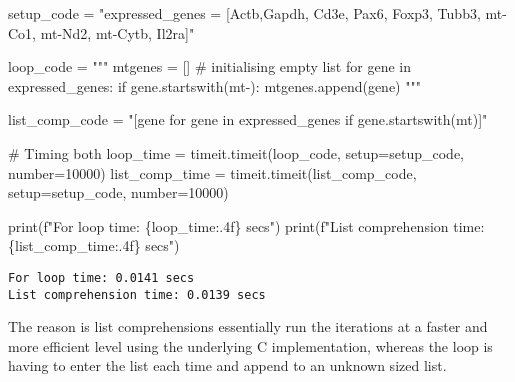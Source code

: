 \documentclass[
  letterpaper,
  DIV=11,
  numbers=noendperiod]{scrartcl}
\newenvironment{Shaded}{\begin{snugshade}}{\end{snugshade}}
\newcommand{\BuiltInTok}[1]{\textcolor[rgb]{0.00,0.23,0.31}{#1}}
\newcommand{\CommentTok}[1]{\textcolor[rgb]{0.37,0.37,0.37}{#1}}
\newcommand{\DecValTok}[1]{\textcolor[rgb]{0.68,0.00,0.00}{#1}}
\newcommand{\NormalTok}[1]{\textcolor[rgb]{0.00,0.23,0.31}{#1}}
\newcommand{\OperatorTok}[1]{\textcolor[rgb]{0.37,0.37,0.37}{#1}}
\newcommand{\SpecialCharTok}[1]{\textcolor[rgb]{0.37,0.37,0.37}{#1}}
\newcommand{\SpecialStringTok}[1]{\textcolor[rgb]{0.13,0.47,0.30}{#1}}
\newcommand{\StringTok}[1]{\textcolor[rgb]{0.13,0.47,0.30}{#1}}
\begin{document}
\begin{Shaded}
\begin{Highlighting}[]
\NormalTok{setup\_code }\OperatorTok{=} \StringTok{"expressed\_genes = [\textquotesingle{}Actb\textquotesingle{},\textquotesingle{}Gapdh\textquotesingle{}, \textquotesingle{}Cd3e\textquotesingle{}, \textquotesingle{}Pax6\textquotesingle{}, \textquotesingle{}Foxp3\textquotesingle{}, \textquotesingle{}Tubb3\textquotesingle{}, \textquotesingle{}mt{-}Co1\textquotesingle{}, \textquotesingle{}mt{-}Nd2\textquotesingle{}, \textquotesingle{}mt{-}Cytb\textquotesingle{}, \textquotesingle{}Il2ra\textquotesingle{}]"}

\NormalTok{loop\_code }\OperatorTok{=} \StringTok{"""}
\StringTok{mtgenes = [] \# initialising empty list}
\StringTok{for gene in expressed\_genes:}
\StringTok{  if gene.startswith(\textquotesingle{}mt{-}\textquotesingle{}):}
\StringTok{    mtgenes.append(gene)}
\StringTok{"""}

\NormalTok{list\_comp\_code }\OperatorTok{=} \StringTok{"[gene for gene in expressed\_genes if gene.startswith(\textquotesingle{}mt\textquotesingle{})]"}


\CommentTok{\# Timing both}
\NormalTok{loop\_time }\OperatorTok{=}\NormalTok{ timeit.timeit(loop\_code, setup}\OperatorTok{=}\NormalTok{setup\_code, number}\OperatorTok{=}\DecValTok{10000}\NormalTok{)}
\NormalTok{list\_comp\_time }\OperatorTok{=}\NormalTok{ timeit.timeit(list\_comp\_code, setup}\OperatorTok{=}\NormalTok{setup\_code, number}\OperatorTok{=}\DecValTok{10000}\NormalTok{)}

\BuiltInTok{print}\NormalTok{(}\SpecialStringTok{f"For loop time: }\SpecialCharTok{\{}\NormalTok{loop\_time}\SpecialCharTok{:.4f\}}\SpecialStringTok{ secs"}\NormalTok{)}
\BuiltInTok{print}\NormalTok{(}\SpecialStringTok{f"List comprehension time: }\SpecialCharTok{\{}\NormalTok{list\_comp\_time}\SpecialCharTok{:.4f\}}\SpecialStringTok{ secs"}\NormalTok{)}
\end{Highlighting}
\end{Shaded}

\begin{verbatim}
For loop time: 0.0141 secs
List comprehension time: 0.0139 secs
\end{verbatim}

The reason is list comprehensions essentially run the iterations at a
faster and more efficient level using the underlying C implementation,
whereas the loop is having to enter the list each time and append to an
unknown sized list.
\end{document}
